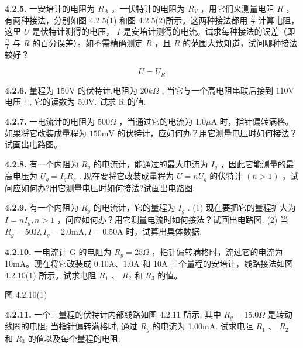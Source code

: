 \vfill
\newpage

\textbf{4.2.5.} 一安培计的电阻为 $R_A$ ，一伏特计的电阻为 $R_V$ ，用它们来测量电阻 $R$ ，有两种接法，分别如图 4.2.5(1) 和图 4.2.5(2)所示。这两种接法都用 $\displaystyle \frac{U}{I}$ 计算电阻，这里 $U$ 是伏特计测得的电压， $I$ 是安培计测得的电流。试求每种接法的误差（即 $\displaystyle \frac{U}{I}$ 与 $R$ 的百分误差）。如不需精确测定 $R$ ，且 $R$ 的范围大致知道，试问哪种接法较好？

\[
U = U _ {R}
\]

\vfill
\newpage

\textbf{4.2.6.} 量程为 150V 的伏特计,电阻为 $20k\Omega$ , 当它与一个高电阻串联后接到 110V 电压上, 它的读数为 5.0V. 试求 R 的值.

\vfill
\newpage

\textbf{4.2.7.} 一电流计的电阻为 $500\Omega$ ，当通过它的电流为 $1.0\mu \mathrm{A}$ 时，指针偏转满格。如果将它改装成量程为 $150\mathrm{mV}$ 的伏特计，应如何办？用它测量电压时如何接法？试画出电路图。

\vfill
\newpage

\textbf{4.2.8.} 有一个内阻为 $R_{g}$ 的电流计，能通过的最大电流为 $I_{g}$ ，因此它能测量的最高电压为 $U_{g} = I_{g}R_{g}$ . 现在要将它改装成量程为 $U = nU_{g}$ 的伏特计 $(n > 1)$ ，试问应如何办?用它测量电压时如何接法?试画出电路图.

\vfill
\newpage

\textbf{4.2.9.} 有一个内阻为 $R_{g}$ 的电流计，它的量程为 $I_{g}$ . (1) 现在要把它的量程扩大为 $I = nI_{g}, n > 1$ ，问应如何办？用它测量电流时如何接法？试画出电路图. (2) 当 $R_{g} = 50\Omega, I_{g} = 2.0\mathrm{mA}, I = 0.50\mathrm{A}$ 时，试算出具体数据.

\vfill
\newpage

\textbf{4.2.10.} 一电流计 G 的电阻为 $R_{g}=25\Omega$ ，指针偏转满格时，流过它的电流为 10mA。现在将它改装成 0.10A、1.0A 和 10A 三个量程的安培计，线路接法如图 4.2.10(1) 所示。试求电阻 $R_{1}$ 、 $R_{2}$ 和 $R_{3}$ 的值。

图 4.2.10(1)

\begin{center}
\end{center}

\vfill
\newpage

\textbf{4.2.11.} 一个三量程的伏特计内部线路如图 4.2.11 所示, 其中 $R_{g}=15.0\Omega$ 是转动线圈的电阻; 当指针偏转满格时, 通过 $R_{g}$ 的电流为 1.00mA. 试求电阻 $R_{1}$ 、 $R_{2}$ 和 $R_{3}$ 的值以及每个量程的电阻.

